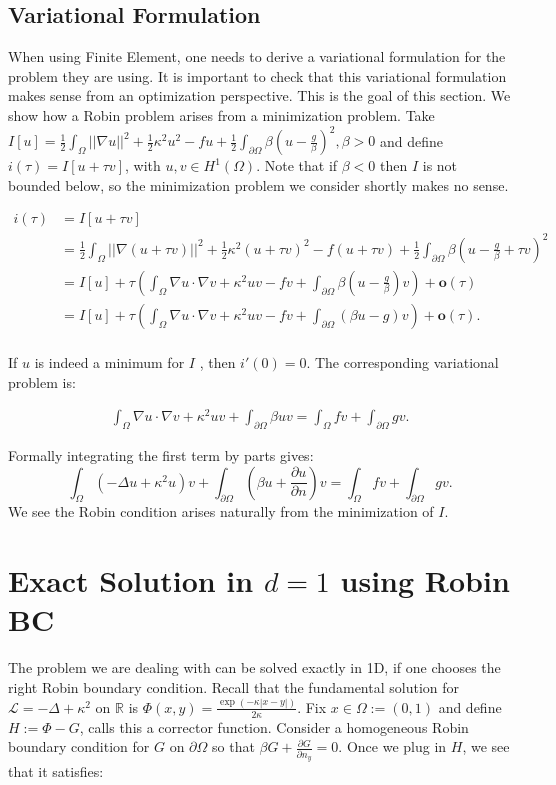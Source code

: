 \documentclass[paper=a4, fontsize=11pt]{scrartcl} %
\numberwithin{equation}{section} %
\numberwithin{figure}{section} %
\numberwithin{table}{section} %
\newcommand{\Op}{\mathcal{L}}
\begin{document}
\subsection{Variational Formulation}
When using Finite Element, one needs to derive a variational formulation for the problem they are using. It is important 
to check that this variational formulation makes sense from an optimization perspective. This is the 
goal of this section. We show how a Robin problem arises from a minimization problem.
Take $I[u] = \frac{1}{2}\int_{\Omega} ||\nabla u||^{2} + \frac{1}{2}\kappa^{2}u^2 - fu + \frac{1}{2}\int_{\partial \Omega} \beta( u-\frac{g}{\beta})^2, \beta > 0$ and define
$i(\tau) = I[u + \tau v]$, with $u,v \in H^{1}(\Omega)$. Note that if $\beta < 0$ then $I$ is not bounded below, so the minimization
problem we consider shortly makes no sense.

\begin{align*}
  i(\tau) &= I[u + \tau v ] \\
  &= \frac{1}{2}\int_{\Omega} ||\nabla (u+ \tau v)||^{2} + \frac{1}{2}\kappa^{2}(u+ \tau v)^2 - f(u + \tau v) + \frac{1}{2}\int_{\partial \Omega} \beta(u- \frac{g}{\beta}+ \tau v)^2 \\
  &= I[u] + \tau ( \int_{\Omega} \nabla u \cdot \nabla v + \kappa^{2}uv - fv + \int_{\partial \Omega} \beta( u - \frac{g}{\beta}) v ) +\mathbf{o} (\tau)\\
  &= I[u] + \tau ( \int_{\Omega} \nabla u \cdot \nabla v + \kappa^{2}uv - fv + \int_{\partial \Omega} (\beta u - g) v ) +\mathbf{o} (\tau).\\ 
\end{align*}

If $u$ is indeed a minimum for $I$ , then $i'(0) = 0$. The corresponding variational problem is:

\begin{align*}
\int_{\Omega} \nabla u \cdot \nabla v + \kappa^{2}uv + \int_{\partial \Omega} \beta u v  =\int_{\Omega} fv +\int_{\partial \Omega} gv. 
\end{align*}

Formally integrating the first term by parts gives:
$$
\int_{\Omega}  (-\Delta u + \kappa^{2} u) v + \int_{\partial \Omega} ( \beta u + \frac{ \partial u }{\partial n } )v = \int_{\Omega} fv + \int_{\partial \Omega} gv.
$$
We see the Robin condition arises naturally from the minimization of $I$. 


\section{Exact Solution in $d=1$ using Robin BC}
The problem we are dealing with can be solved exactly in 1D, if one chooses the right
Robin boundary condition.
Recall that the fundamental solution for $\Op = -\Delta + \kappa^{2}$ on $\mathbb{R}$ is $\Phi(x,y) = \frac{\exp( -\kappa |x-y| ) }{2\kappa}$.
Fix $x \in \Omega := (0,1)$ and define $H:=  \Phi - G$,  \cite{evans} calls this a corrector function. 
Consider a homogeneous Robin boundary condition
for $G$ on $\partial \Omega$ so that $\beta G + \frac{ \partial G}{\partial n_{y}} = 0$.
Once we plug in $H$, we see that it satisfies:
\end{document}

